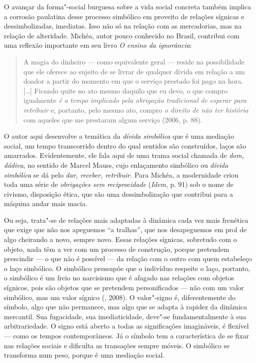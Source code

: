O avançar da forma"-social burguesa sobre a vida social concreta também
implica a corrosão paulatina desse processo simbólico em proveito de
relações sígnicas e dessimbolizadas, imediatas. Isso não só na relação
com as mercadorias, mas na relação de alteridade. Michéa, autor pouco
conhecido no Brasil, contribui com uma reflexão importante em seu livro
\emph{O ensino da ignorância}:

\begin{quote}
A magia do dinheiro --- como equivalente geral --- reside na possibilidade
que ele oferece ao sujeito de se livrar de qualquer dívida em relação a
um doador a partir do momento em que o serviço prestado foi pago na
hora. [\ldots{}] Ficando quite no ato mesmo daquilo que eu devo, o
que compro igualmente \emph{é o tempo implicado pela obrigação
tradicional de esperar para retribuir} e, portanto, pelo mesmo ato,
compro \emph{o direito de não ter história} com aqueles que me prestaram
algum serviço (2006, p. 88).
\end{quote}

O autor aqui desenvolve a temática da \emph{dívida simbólica} que é uma
mediação social, um tempo transcorrido dentro do qual sentidos são
construídos, laços são amarrados. Evidentemente, ele fala aqui de uma
trama social chamada de \emph{dom, dádiva}, no sentido de Marcel Mauss,
cujo enlaçamento simbólico ou \emph{dívida simbólica} se dá pelo
\emph{dar, receber, retribuir.} Para Michéa, a modernidade criou toda
uma série de \emph{obrigações sem reciprocidade} (\emph{Idem}, p. 91)
sob o nome de civismo, disposição ética, que são uma dessimbolização que
contribui para a máquina andar mais macia.

Ou seja, trata"-se de relações mais adaptadas à dinâmica cada vez mais
frenética que exige que não nos apeguemos ``a tralhas'', que nos
desapeguemos em prol de algo cheirando a novo, sempre novo. Essas
relações sígnicas, sobretudo com o objeto, nada têm a ver com um
processo de construção, porque pretendem prescindir --- o que não é
possível --- da relação com o outro com quem estabeleço o laço simbólico.
O simbólico pressupõe que o indivíduo respeite o laço, portanto, o
simbólico é um freio no narcisismo que é afagado nas relações com
objetos sígnicos, pois são objetos que se pretendem personificados ---
não com um valor simbólico, mas um valor sígnico (, 2008). O
valor"-signo é, diferentemente do símbolo, algo que não permanece, mas
algo que se adapta à rapidez da dinâmica mercantil. Sua fugacidade, sua
imediaticidade, deve"-se fundamentalmente à sua arbitrariedade. O signo
está aberto a todas as significações imagináveis, é flexível --- como os
tempos contemporâneos. Já o símbolo tem a característica de se fixar nas
relações sociais e dificulta as transações sempre móveis. O simbólico se
transforma num peso, porque é uma mediação social.


